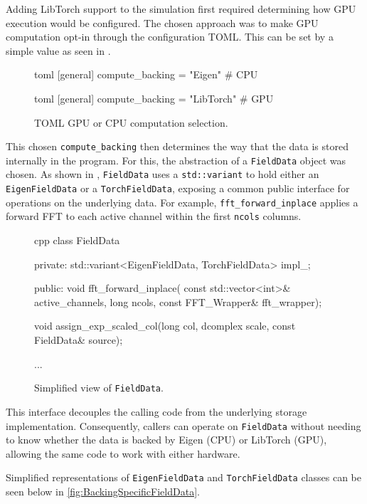 Adding LibTorch support to the simulation first required determining how GPU execution would be configured. 
The chosen approach was to make GPU computation opt-in through the configuration TOML.
This can be set by a simple value as seen in .

\begin{figure}
\begin{code}{toml}
[general]
compute_backing = "Eigen" # CPU
\end{code}
\begin{code}{toml}
[general]
compute_backing = "LibTorch" # GPU
\end{code}
  \caption{TOML GPU or CPU computation selection.}
  \label{fig:gpu-opt-in}
\end{figure}

This chosen \texttt{compute\_backing} then determines the way that the data is stored internally in the program.
For this, the abstraction of a \texttt{FieldData} object was chosen.
As shown in , \texttt{FieldData} uses a \texttt{std::variant} to hold either an \texttt{EigenFieldData} or a \texttt{TorchFieldData}, 
exposing a common public interface for operations on the underlying data. 
For example, \texttt{fft\_forward\_inplace} applies a forward FFT to each active channel within the first \texttt{ncols} columns.

\begin{figure}
\begin{code}{cpp}
class FieldData {
private:
    std::variant<EigenFieldData, TorchFieldData> impl_;

public:
    void fft_forward_inplace(
        const std::vector<int>& active_channels, long ncols, const FFT_Wrapper& fft_wrapper);

    void assign_exp_scaled_col(long col, dcomplex scale, const FieldData& source);

    ...

}
\end{code}
  \caption{Simplified view of \texttt{FieldData}.}
  \label{fig:FieldData-code}
\end{figure}

This interface decouples the calling code from the underlying storage implementation. 
Consequently, callers can operate on \texttt{FieldData} without needing to know whether the data is backed by Eigen (CPU) or LibTorch (GPU), 
allowing the same code to work with either hardware.

Simplified representations of \texttt{EigenFieldData} and \texttt{TorchFieldData} classes can be seen below in \cref{fig:BackingSpecificFieldData}.

